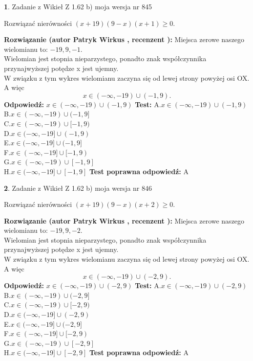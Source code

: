 \documentclass[12pt, a4paper]{article}
\theoremstyle{definition} %
\newtheorem{zad}{}
\newcommand{\zadStart}[1]{\begin{zad}#1\newline}
\newcommand{\zadStop}{\end{zad}}
\newcommand{\rozwStart}[2]{\noindent \textbf{Rozwiązanie (autor #1 , recenzent #2): }\newline}
\newcommand{\rozwStop}{\newline}
\newcommand{\odpStart}{\noindent \textbf{Odpowiedź:}\newline}
\newcommand{\odpStop}{\newline}
\newcommand{\testStart}{\noindent \textbf{Test:}\newline}
\newcommand{\testStop}{\newline}
\newcommand{\kluczStart}{\noindent \textbf{Test poprawna odpowiedź:}\newline}
\newcommand{\kluczStop}{\newline}
\begin{document}
\zadStart{Zadanie z Wikieł Z 1.62 b) moja wersja nr 845}

Rozwiązać nierówności $(x+19)(9-x)(x+1)\ge0$.
\zadStop
\rozwStart{Patryk Wirkus}{}
Miejsca zerowe naszego wielomianu to: $-19, 9, -1$.\\
Wielomian jest stopnia nieparzystego, ponadto znak współczynnika przy\linebreak najwyższej potędze x jest ujemny.\\ W związku z tym wykres wielomianu zaczyna się od lewej strony powyżej osi OX. A więc $$x \in (-\infty,-19) \cup (-1,9).$$
\rozwStop
\odpStart
$x \in (-\infty,-19) \cup (-1,9)$
\odpStop
\testStart
A.$x \in (-\infty,-19) \cup (-1,9)$\\
B.$x \in (-\infty,-19) \cup (-1,9]$\\
C.$x \in (-\infty,-19) \cup [-1,9)$\\
D.$x \in (-\infty,-19] \cup (-1,9)$\\
E.$x \in (-\infty,-19] \cup (-1,9]$\\
F.$x \in (-\infty,-19] \cup [-1,9)$\\
G.$x \in (-\infty,-19) \cup [-1,9]$\\
H.$x \in (-\infty,-19] \cup [-1,9]$
\testStop
\kluczStart
A
\kluczStop



\zadStart{Zadanie z Wikieł Z 1.62 b) moja wersja nr 846}

Rozwiązać nierówności $(x+19)(9-x)(x+2)\ge0$.
\zadStop
\rozwStart{Patryk Wirkus}{}
Miejsca zerowe naszego wielomianu to: $-19, 9, -2$.\\
Wielomian jest stopnia nieparzystego, ponadto znak współczynnika przy\linebreak najwyższej potędze x jest ujemny.\\ W związku z tym wykres wielomianu zaczyna się od lewej strony powyżej osi OX. A więc $$x \in (-\infty,-19) \cup (-2,9).$$
\rozwStop
\odpStart
$x \in (-\infty,-19) \cup (-2,9)$
\odpStop
\testStart
A.$x \in (-\infty,-19) \cup (-2,9)$\\
B.$x \in (-\infty,-19) \cup (-2,9]$\\
C.$x \in (-\infty,-19) \cup [-2,9)$\\
D.$x \in (-\infty,-19] \cup (-2,9)$\\
E.$x \in (-\infty,-19] \cup (-2,9]$\\
F.$x \in (-\infty,-19] \cup [-2,9)$\\
G.$x \in (-\infty,-19) \cup [-2,9]$\\
H.$x \in (-\infty,-19] \cup [-2,9]$
\testStop
\kluczStart
A
\kluczStop
\end{document}
